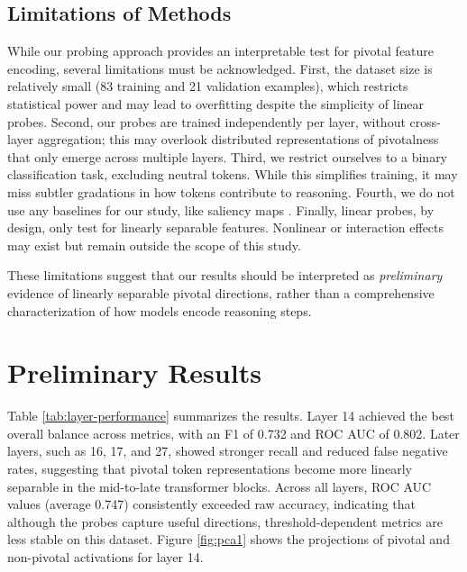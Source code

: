 \documentclass[11pt]{article}
\begin{document}
\subsection{Limitations of Methods}
While our probing approach provides an interpretable test for pivotal feature encoding, several limitations must be acknowledged. First, the dataset size is relatively small (83 training and 21 validation examples), which restricts statistical power and may lead to overfitting despite the simplicity of linear probes. Second, our probes are trained independently per layer, without cross-layer aggregation; this may overlook distributed representations of pivotalness that only emerge across multiple layers. Third, we restrict ourselves to a binary classification task, excluding neutral tokens. While this simplifies training, it may miss subtler gradations in how tokens contribute to reasoning. Fourth, we do not use any baselines for our study, like saliency maps \cite{ismail2021improvingdeeplearninginterpretability}. Finally, linear probes, by design, only test for linearly separable features. Nonlinear or interaction effects may exist but remain outside the scope of this study. 

These limitations suggest that our results should be interpreted as \textit{preliminary} evidence of linearly separable pivotal directions, rather than a comprehensive characterization of how models encode reasoning steps.

\section{Preliminary Results}

Table \ref{tab:layer-performance} summarizes the results. Layer 14 achieved the best overall balance across metrics, with an F1 of 0.732 and ROC AUC of 0.802. Later layers, such as 16, 17, and 27, showed stronger recall and reduced false negative rates, suggesting that pivotal token representations become more linearly separable in the mid-to-late transformer blocks. Across all layers, ROC AUC values (average 0.747) consistently exceeded raw accuracy, indicating that although the probes capture useful directions, threshold-dependent metrics are less stable on this dataset. Figure \ref{fig:pca1} shows the projections of pivotal and non-pivotal activations for layer 14.
\end{document}
